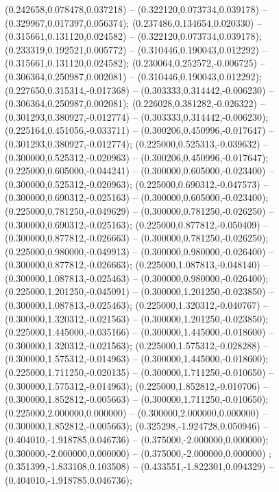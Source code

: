  (0.242658,0.078478,0.037218) -- (0.322120,0.073734,0.039178) -- (0.329967,0.017397,0.056374);
 (0.237486,0.134654,0.020330) -- (0.315661,0.131120,0.024582) -- (0.322120,0.073734,0.039178);
 (0.233319,0.192521,0.005772) -- (0.310446,0.190043,0.012292) -- (0.315661,0.131120,0.024582);
 (0.230064,0.252572,-0.006725) -- (0.306364,0.250987,0.002081) -- (0.310446,0.190043,0.012292);
 (0.227650,0.315314,-0.017368) -- (0.303333,0.314442,-0.006230) -- (0.306364,0.250987,0.002081);
 (0.226028,0.381282,-0.026322) -- (0.301293,0.380927,-0.012774) -- (0.303333,0.314442,-0.006230);
 (0.225164,0.451056,-0.033711) -- (0.300206,0.450996,-0.017647) -- (0.301293,0.380927,-0.012774);
 (0.225000,0.525313,-0.039632) -- (0.300000,0.525312,-0.020963) -- (0.300206,0.450996,-0.017647);
 (0.225000,0.605000,-0.044241) -- (0.300000,0.605000,-0.023400) -- (0.300000,0.525312,-0.020963);
 (0.225000,0.690312,-0.047573) -- (0.300000,0.690312,-0.025163) -- (0.300000,0.605000,-0.023400);
 (0.225000,0.781250,-0.049629) -- (0.300000,0.781250,-0.026250) -- (0.300000,0.690312,-0.025163);
 (0.225000,0.877812,-0.050409) -- (0.300000,0.877812,-0.026663) -- (0.300000,0.781250,-0.026250);
 (0.225000,0.980000,-0.049913) -- (0.300000,0.980000,-0.026400) -- (0.300000,0.877812,-0.026663);
 (0.225000,1.087813,-0.048140) -- (0.300000,1.087813,-0.025463) -- (0.300000,0.980000,-0.026400);
 (0.225000,1.201250,-0.045091) -- (0.300000,1.201250,-0.023850) -- (0.300000,1.087813,-0.025463);
 (0.225000,1.320312,-0.040767) -- (0.300000,1.320312,-0.021563) -- (0.300000,1.201250,-0.023850);
 (0.225000,1.445000,-0.035166) -- (0.300000,1.445000,-0.018600) -- (0.300000,1.320312,-0.021563);
 (0.225000,1.575312,-0.028288) -- (0.300000,1.575312,-0.014963) -- (0.300000,1.445000,-0.018600);
 (0.225000,1.711250,-0.020135) -- (0.300000,1.711250,-0.010650) -- (0.300000,1.575312,-0.014963);
 (0.225000,1.852812,-0.010706) -- (0.300000,1.852812,-0.005663) -- (0.300000,1.711250,-0.010650);
 (0.225000,2.000000,0.000000) -- (0.300000,2.000000,0.000000) -- (0.300000,1.852812,-0.005663);
 (0.325298,-1.924728,0.050946) -- (0.404010,-1.918785,0.046736) -- (0.375000,-2.000000,0.000000);
 (0.300000,-2.000000,0.000000) -- (0.375000,-2.000000,0.000000) ;
 (0.351399,-1.833108,0.103508) -- (0.433551,-1.822301,0.094329) -- (0.404010,-1.918785,0.046736);
